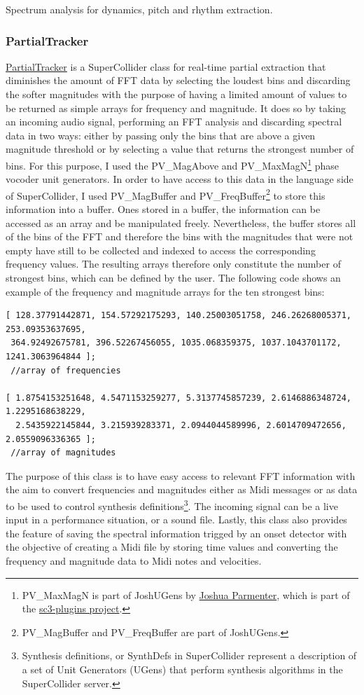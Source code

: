 Spectrum analysis for dynamics, pitch and rhythm extraction. 

\hypertarget{partrack}{}
\subsubsection{PartialTracker}

\href{http://github.com/freuben/FedeLib/blob/master/PartialTracking/PartialTracker.sc}{PartialTracker} is a SuperCollider class for real-time partial extraction that diminishes the amount of FFT data by selecting the loudest bins and discarding the softer magnitudes with the purpose of having a limited amount of values to be returned as simple arrays for frequency and magnitude. It does so by taking an incoming audio signal, performing an FFT analysis and discarding spectral data in two ways: either by passing only the bins that are above a given magnitude threshold or by selecting a value that returns the strongest number of bins. For this purpose, I used the PV\_MagAbove and PV\_MaxMagN\footnote{PV\_MaxMagN is part of JoshUGens by \href{http://www.realizedsound.net/josh/}{Joshua Parmenter}, which is part of the \href{http://sourceforge.net/projects/sc3-plugins/}{sc3-plugins project}.} phase vocoder unit generators. In order to have access to this data in the language side of SuperCollider, I used PV\_MagBuffer and PV\_FreqBuffer\footnote{PV\_MagBuffer and PV\_FreqBuffer are part of JoshUGens.} to store this information into a buffer. Ones stored in a buffer, the information can be accessed as an array and be manipulated freely. Nevertheless, the buffer stores all of the bins of the FFT and therefore the bins with the magnitudes that were not empty have still to be collected and indexed to access the corresponding frequency values. The resulting arrays therefore only constitute the number of strongest bins, which can be defined by the user. The following code shows an example of the frequency and magnitude arrays for the ten strongest bins:

\begin{verbatim}
[ 128.37791442871, 154.57292175293, 140.25003051758, 246.26268005371, 253.09353637695,
 364.92492675781, 396.52267456055, 1035.068359375, 1037.1043701172, 1241.3063964844 ]; 
 //array of frequencies

[ 1.8754153251648, 4.5471153259277, 5.3137745857239, 2.6146886348724, 1.2295168638229,
  2.5435922145844, 3.215939283371, 2.0944044589996, 2.6014709472656, 2.0559096336365 ]; 
 //array of magnitudes
\end{verbatim}
The purpose of this class is to have easy access to relevant FFT information with the aim to convert frequencies and magnitudes either as Midi messages or as data to be used to control synthesis definitions\footnote{Synthesis definitions, or SynthDefs in SuperCollider represent a description of a set of Unit Generators (UGens) that perform synthesis algorithms in the SuperCollider server.}. The incoming signal can be a live input in a performance situation, or a sound file. Lastly, this class also provides the feature of saving the spectral information trigged by an onset detector with the objective of  creating a Midi file by storing time values and converting the frequency and magnitude data to Midi notes and velocities.

